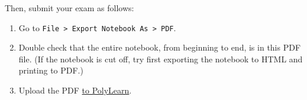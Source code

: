 \documentclass[11pt]{article}
\providecommand{\tightlist}{%
      \setlength{\itemsep}{0pt}\setlength{\parskip}{0pt}}
\begin{document}
Then, submit your exam as follows:

\begin{enumerate}
\def\labelenumi{\arabic{enumi}.}
\tightlist
\item
  Go to
  \texttt{File\ \textgreater{}\ Export\ Notebook\ As\ \textgreater{}\ PDF}.
\item
  Double check that the entire notebook, from beginning to end, is in
  this PDF file. (If the notebook is cut off, try first exporting the
  notebook to HTML and printing to PDF.)
\item
  Upload the PDF
  \href{https://polylearn.calpoly.edu/AY_2018-2019/mod/assign/view.php?id=319390}{to
  PolyLearn}.
\end{enumerate}


    
    
    
    
\end{document}
